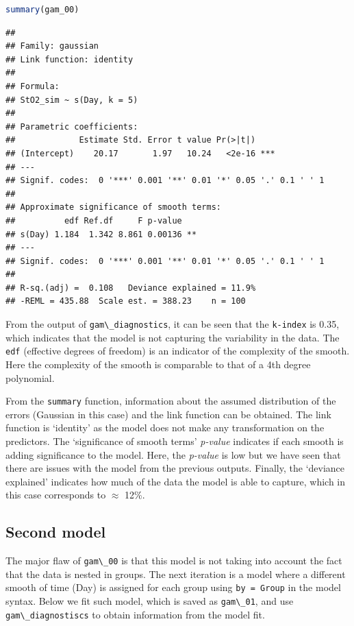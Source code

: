 \documentclass[
]{article}
\newcommand{\passthrough}[1]{#1}
\begin{document}
\begin{lstlisting}[language=R]
summary(gam_00)
\end{lstlisting}

\begin{lstlisting}
## 
## Family: gaussian 
## Link function: identity 
## 
## Formula:
## StO2_sim ~ s(Day, k = 5)
## 
## Parametric coefficients:
##             Estimate Std. Error t value Pr(>|t|)    
## (Intercept)    20.17       1.97   10.24   <2e-16 ***
## ---
## Signif. codes:  0 '***' 0.001 '**' 0.01 '*' 0.05 '.' 0.1 ' ' 1
## 
## Approximate significance of smooth terms:
##          edf Ref.df     F p-value   
## s(Day) 1.184  1.342 8.861 0.00136 **
## ---
## Signif. codes:  0 '***' 0.001 '**' 0.01 '*' 0.05 '.' 0.1 ' ' 1
## 
## R-sq.(adj) =  0.108   Deviance explained = 11.9%
## -REML = 435.88  Scale est. = 388.23    n = 100
\end{lstlisting}

From the output of \passthrough{\lstinline!gam\_diagnostics!}, it can be seen that the \passthrough{\lstinline!k-index!} is 0.35, which indicates that the model is not capturing the variability in the data. The \passthrough{\lstinline!edf!} (effective degrees of freedom) is an indicator of the complexity of the smooth. Here the complexity of the smooth is comparable to that of a 4th degree polynomial.

From the \passthrough{\lstinline!summary!} function, information about the assumed distribution of the errors (Gaussian in this case) and the link function can be obtained. The link function is `identity' as the model does not make any transformation on the predictors. The `significance of smooth terms' \emph{p-value} indicates if each smooth is adding significance to the model. Here, the \emph{p-value} is low but we have seen that there are issues with the model from the previous outputs. Finally, the `deviance explained' indicates how much of the data the model is able to capture, which in this case corresponds to \(\approx\) 12\%.

\hypertarget{second-model}{%
\subsection{Second model}\label{second-model}}

The major flaw of \passthrough{\lstinline!gam\_00!} is that this model is not taking into account the fact that the data is nested in groups. The next iteration is a model where a different smooth of time (Day) is assigned for each group using \passthrough{\lstinline!by = Group!} in the model syntax. Below we fit such model, which is saved as \passthrough{\lstinline!gam\_01!}, and use \passthrough{\lstinline!gam\_diagnostiscs!} to obtain information from the model fit.
\end{document}

